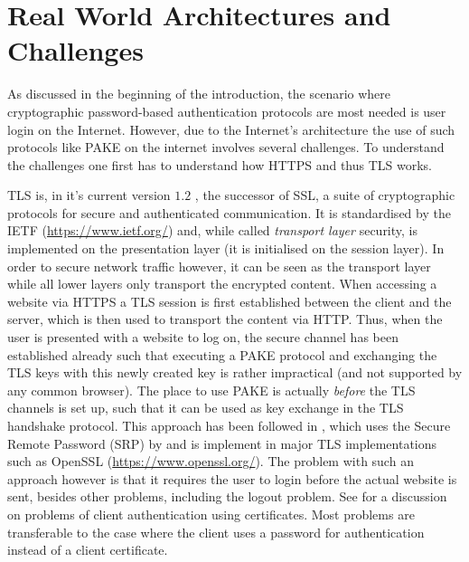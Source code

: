 \section{Real World Architectures and Challenges}
As discussed in the beginning of the introduction, the scenario where cryptographic password-based authentication protocols are most needed is user login on the Internet.
However, due to the Internet's architecture the use of such protocols like \ac{PAKE} on the internet involves several challenges.
To understand the challenges one first has to understand how \ac{HTTPS} and thus \ac{TLS} works.

\acl{TLS} is, in it's current version $1.2$ \cite{rfc5246,rfc6176,rfc4492}, the successor of \ac{SSL}, a suite of cryptographic protocols for secure and authenticated communication.
It is standardised by the \ac{IETF} (\url{https://www.ietf.org/}) and, while called \emph{transport layer} security, is implemented on the presentation layer (it is initialised on the session layer).
In order to secure network traffic however, it can be seen as the transport layer while all lower layers only transport the encrypted content.
When accessing a website via \ac{HTTPS} a \ac{TLS} session is first established between the client and the server, which is then used to transport the content via \ac{HTTP}.
Thus, when the user is presented with a website to log on, the secure channel has been established already such that executing a \ac{PAKE} protocol and exchanging the \ac{TLS} keys with this newly created key is rather impractical (and not supported by any common browser).
The place to use \ac{PAKE} is actually \emph{before} the \ac{TLS} channels is set up, such that it can be used as key exchange in the \ac{TLS} handshake protocol.
This approach has been followed in \cite{rfc5054}, which uses the Secure Remote Password (SRP) by \cite{Wu98} and is implement in major \ac{TLS} implementations such as OpenSSL (\url{https://www.openssl.org/}).
The problem with such an approach however is that it requires the user to login before the actual website is sent, besides other problems, including the logout problem.
See \citet{Parsovs14} for a discussion on problems of client authentication using certificates.
Most problems are transferable to the case where the client uses a password for authentication instead of a client certificate.


